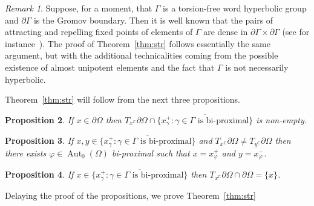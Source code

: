\documentclass[12pt]{amsart}
\theoremstyle{plain}
\newtheorem{proposition}{Proposition}[section]
\theoremstyle{definition}
\theoremstyle{remark}
\newtheorem{remark}[proposition]{Remark}
\begin{document}
\begin{remark}
Suppose, for a moment, that $\Gamma$ is a torsion-free word hyperbolic group and $\partial \Gamma$ is the Gromov boundary. Then it is well known that the pairs of attracting and repelling fixed points of elements of $\Gamma$ are dense in $\partial \Gamma \times \partial \Gamma$ (see for instance~\cite[Corollary 8.2.G]{G1987}). The proof of Theorem~\ref{thm:str} follows essentially the same argument, but with the additional technicalities coming from the possible existence of almost unipotent elements and the fact that $\Gamma$ is not necessarily hyperbolic. 
\end{remark}

Theorem~\ref{thm:str} will follow from the next three propositions. 

\begin{proposition}\label{prop:str_1}
 If $x \in \partial \Omega$ then $T_x^\operatorname{\mathbb{C}} \partial \Omega \cap \overline{\{ x^+_{\gamma} : \gamma \in \Gamma \text{ is bi-proximal} \}}$ is non-empty.
\end{proposition}

\begin{proposition}\label{prop:str_2}
If $x,y \in \overline{\{ x^+_{\gamma} : \gamma \in \Gamma \text{ is bi-proximal} \}}$ and $T_x^\operatorname{\mathbb{C}} \partial \Omega \neq T_y^\operatorname{\mathbb{C}} \partial \Omega$ then there exists $\varphi \in \operatorname{Aut}_0(\Omega)$ bi-proximal such that $x=x^+_{\varphi}$ and $y=x^-_{\varphi}$.
\end{proposition}

\begin{proposition}
\label{prop:str_3}
If $x\in \overline{\{ x^+_{\gamma} : \gamma \in \Gamma \text{ is bi-proximal} \}}$ then $T_x^\operatorname{\mathbb{C}} \partial \Omega \cap \partial \Omega = \{x\}$.
\end{proposition}

Delaying the proof of the propositions, we prove Theorem~\ref{thm:str}
\end{document}
